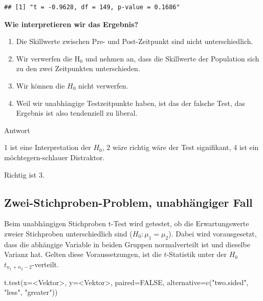 \documentclass[
]{book}
\newenvironment{Shaded}{\begin{snugshade}}{\end{snugshade}}
\newcommand{\AttributeTok}[1]{\textcolor[rgb]{0.77,0.63,0.00}{#1}}
\newcommand{\ConstantTok}[1]{\textcolor[rgb]{0.00,0.00,0.00}{#1}}
\newcommand{\FunctionTok}[1]{\textcolor[rgb]{0.00,0.00,0.00}{#1}}
\newcommand{\NormalTok}[1]{#1}
\newcommand{\SpecialCharTok}[1]{\textcolor[rgb]{0.00,0.00,0.00}{#1}}
\newcommand{\StringTok}[1]{\textcolor[rgb]{0.31,0.60,0.02}{#1}}
\begin{document}
\begin{verbatim}
## [1] "t = -0.9628, df = 149, p-value = 0.1686"
\end{verbatim}

\textbf{Wie interpretieren wir das Ergebnis?}

\begin{enumerate}
\def\labelenumi{\arabic{enumi}.}
\item
  Die Skillwerte zwischen Pre- und Post-Zeitpunkt sind nicht unterschiedlich.
\item
  Wir verwerfen die \(\text{H}_0\) und nehmen an, dass die Skillwerte der Population sich zu den zwei Zeitpunkten unterschieden.
\item
  Wir können die \(H_0\) nicht verwerfen.
\item
  Weil wir unabhängige Testzeitpunkte haben, ist das der falsche Test, das Ergebnis ist also tendenziell zu liberal.
\end{enumerate}

Antwort

1 ist eine Interpretation der \(H_0\), 2 wäre richtig wäre der Test signifikant, 4 ist ein möchtegern-schlauer Distraktor.

Richtig ist 3.

\hypertarget{zwei-stichproben-problem-unabhuxe4ngiger-fall}{%
\subsection{Zwei-Stichproben-Problem, unabhängiger Fall}\label{zwei-stichproben-problem-unabhuxe4ngiger-fall}}

Beim unabhängigen Stichproben t-Test wird getestet, ob die Erwartungswerte zweier Stichproben unterschiedlich sind (\(H_0: {\mu}_1 = {\mu}_2\)). Dabei wird vorausgesetzt, dass die abhängige Variable in beiden Gruppen normalverteilt ist und dieselbe Varianz hat. Gelten diese Voraussetzungen, ist die \(t\)-Statistik unter der \(H_0\) \(t_{n_1 + n_2 - 2}\)-verteilt.

\begin{Shaded}
\begin{Highlighting}[]
\FunctionTok{t.test}\NormalTok{(}\AttributeTok{x=}\SpecialCharTok{\textless{}}\NormalTok{Vektor}\SpecialCharTok{\textgreater{}}\NormalTok{, }\AttributeTok{y=}\SpecialCharTok{\textless{}}\NormalTok{Vektor}\SpecialCharTok{\textgreater{}}\NormalTok{, }\AttributeTok{paired=}\ConstantTok{FALSE}\NormalTok{, }
       \AttributeTok{alternative=}\FunctionTok{c}\NormalTok{(}\StringTok{"two.sided"}\NormalTok{, }\StringTok{"less"}\NormalTok{, }\StringTok{"greater"}\NormalTok{))}
\end{Highlighting}
\end{Shaded}
\end{document}
